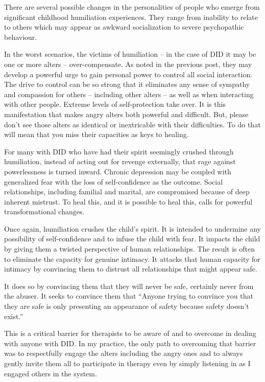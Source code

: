\documentclass[]{book}
\begin{document}
There are several possible changes in the personalities of people who emerge from significant childhood humiliation experiences. They range from inability to relate to others which may appear as awkward socialization to severe psychopathic behaviour.

In the worst scenarios, the victims of humiliation -- in the case of DID it may be one or more alters -- over-compensate. As noted in the previous post, they may develop a powerful urge to gain personal power to control all social interaction. The drive to control can be so strong that it eliminates any sense of sympathy and compassion for others -- including other alters -- as well as when interacting with other people. Extreme levels of self-protection take over. It is this manifestation that makes angry alters both powerful and difficult. But, please don't see those alters as identical or inextricable with their difficulties. To do that will mean that you miss their capacities as keys to healing.

For many with DID who have had their spirit seemingly crushed through humiliation, instead of acting out for revenge externally, that rage against powerlessness is turned inward. Chronic depression may be coupled with generalized fear with the loss of self-confidence as the outcome. Social relationships, including familial and marital, are compromised because of deep inherent mistrust. To heal this, and it is possible to heal this, calls for powerful transformational changes.

Once again, humiliation crushes the child's spirit. It is intended to undermine any possibility of self-confidence and to infuse the child with fear. It impacts the child by giving them a twisted perspective of human relationships. The result is often to eliminate the capacity for genuine intimacy. It attacks that human capacity for intimacy by convincing them to distrust all relationships that might appear safe.

It does so by convincing them that they will never be safe, certainly never from the abuser. It seeks to convince them that ``Anyone trying to convince you that they are safe is only presenting an appearance of safety because safety doesn't exist.''

This is a critical barrier for therapists to be aware of and to overcome in dealing with anyone with DID. In my practice, the only path to overcoming that barrier was to respectfully engage the alters including the angry ones and to always gently invite them all to participate in therapy even by simply listening in as I engaged others in the system.
\end{document}
